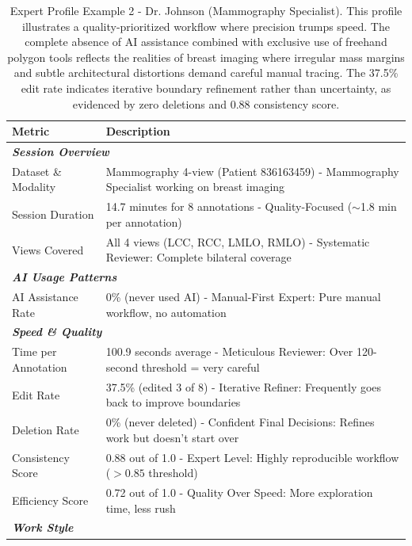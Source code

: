 \documentclass{article}
\begin{document}
\begin{table}[H]
    \caption{Expert Profile Example 2 - Dr. Johnson (Mammography Specialist). This profile illustrates a quality-prioritized workflow where precision trumps speed. The complete absence of AI assistance combined with exclusive use of freehand polygon tools reflects the realities of breast imaging where irregular mass margins and subtle architectural distortions demand careful manual tracing. The 37.5\% edit rate indicates iterative boundary refinement rather than uncertainty, as evidenced by zero deletions and 0.88 consistency score.}
    \centering
    \small
    \begin{tabular}{lp{10cm}}
        \toprule
        \textbf{Metric} & \textbf{Description} \\
        \midrule
        \multicolumn{2}{l}{\textit{\textbf{Session Overview}}} \\
        Dataset \& Modality & Mammography 4-view (Patient 836163459) - Mammography Specialist working on breast imaging \\
        Session Duration & 14.7 minutes for 8 annotations - Quality-Focused ($\sim$1.8 min per annotation) \\
        Views Covered & All 4 views (LCC, RCC, LMLO, RMLO) - Systematic Reviewer: Complete bilateral coverage \\
        \midrule
        \multicolumn{2}{l}{\textit{\textbf{AI Usage Patterns}}} \\
        AI Assistance Rate & 0\% (never used AI) - Manual-First Expert: Pure manual workflow, no automation \\
        \midrule
        \multicolumn{2}{l}{\textit{\textbf{Speed \& Quality}}} \\
        Time per Annotation & 100.9 seconds average - Meticulous Reviewer: Over 120-second threshold = very careful \\
        Edit Rate & 37.5\% (edited 3 of 8) - Iterative Refiner: Frequently goes back to improve boundaries \\
        Deletion Rate & 0\% (never deleted) - Confident Final Decisions: Refines work but doesn't start over \\
        Consistency Score & 0.88 out of 1.0 - Expert Level: Highly reproducible workflow ($>0.85$ threshold) \\
        Efficiency Score & 0.72 out of 1.0 - Quality Over Speed: More exploration time, less rush \\
        \midrule
        \multicolumn{2}{l}{\textit{\textbf{Work Style}}} \\

\end{tabular}
\end{table}
\end{document}
